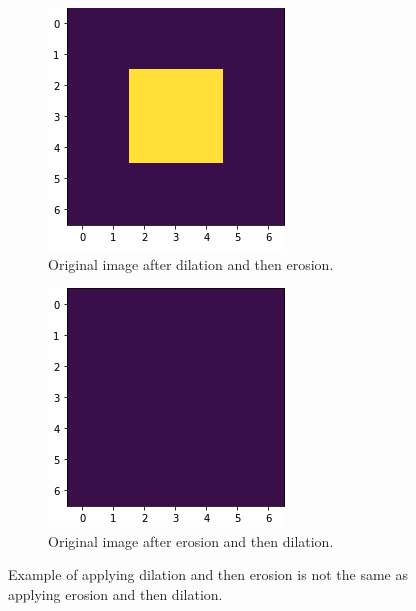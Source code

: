 \begin{figure}[h]
\begin{subfigure}{0.3\linewidth}
		\includegraphics[width=\linewidth]{Materials/morphDilation}
		\caption{Original image after dilation and then erosion.}
	\end{subfigure}
	\hfill
	\begin{subfigure}{0.3\linewidth}
		\centering
		\includegraphics[width=\linewidth]{Materials/morphErosion}
		\caption{Original image after erosion and then dilation.}
	\end{subfigure}
	\caption{Example of applying dilation and then erosion is not the same as applying erosion and then dilation.}
	\label{dilationErosion}
\end{figure}
